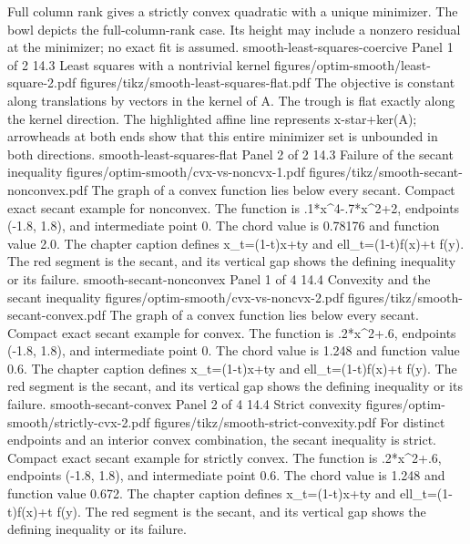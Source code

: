{Full column rank gives a strictly convex quadratic with a unique minimizer.}
{The bowl depicts the full-column-rank case. Its height may include a nonzero residual at the minimizer; no exact fit is assumed.}
{smooth-least-squares-coercive}
{Panel 1 of 2}
{14.3}
{Least squares with a nontrivial kernel}
{figures/optim-smooth/least-square-2.pdf}
{figures/tikz/smooth-least-squares-flat.pdf}
{The objective is constant along translations by vectors in the kernel of A.}
{The trough is flat exactly along the kernel direction. The highlighted affine line represents x-star+ker(A); arrowheads at both ends show that this entire minimizer set is unbounded in both directions.}
{smooth-least-squares-flat}
{Panel 2 of 2}
{14.3}
{Failure of the secant inequality}
{figures/optim-smooth/cvx-vs-noncvx-1.pdf}
{figures/tikz/smooth-secant-nonconvex.pdf}
{The graph of a convex function lies below every secant.}
{Compact exact secant example for nonconvex. The function is .1*x\textasciicircum{}4-.7*x\textasciicircum{}2+2, endpoints (-1.8, 1.8), and intermediate point 0. The chord value is 0.78176 and function value 2.0. The chapter caption defines x\_t=(1-t)x+ty and ell\_t=(1-t)f(x)+t f(y). The red segment is the secant, and its vertical gap shows the defining inequality or its failure.}
{smooth-secant-nonconvex}
{Panel 1 of 4}
{14.4}
{Convexity and the secant inequality}
{figures/optim-smooth/cvx-vs-noncvx-2.pdf}
{figures/tikz/smooth-secant-convex.pdf}
{The graph of a convex function lies below every secant.}
{Compact exact secant example for convex. The function is .2*x\textasciicircum{}2+.6, endpoints (-1.8, 1.8), and intermediate point 0. The chord value is 1.248 and function value 0.6. The chapter caption defines x\_t=(1-t)x+ty and ell\_t=(1-t)f(x)+t f(y). The red segment is the secant, and its vertical gap shows the defining inequality or its failure.}
{smooth-secant-convex}
{Panel 2 of 4}
{14.4}
{Strict convexity}
{figures/optim-smooth/strictly-cvx-2.pdf}
{figures/tikz/smooth-strict-convexity.pdf}
{For distinct endpoints and an interior convex combination, the secant inequality is strict.}
{Compact exact secant example for strictly convex. The function is .2*x\textasciicircum{}2+.6, endpoints (-1.8, 1.8), and intermediate point 0.6. The chord value is 1.248 and function value 0.672. The chapter caption defines x\_t=(1-t)x+ty and ell\_t=(1-t)f(x)+t f(y). The red segment is the secant, and its vertical gap shows the defining inequality or its failure.}
